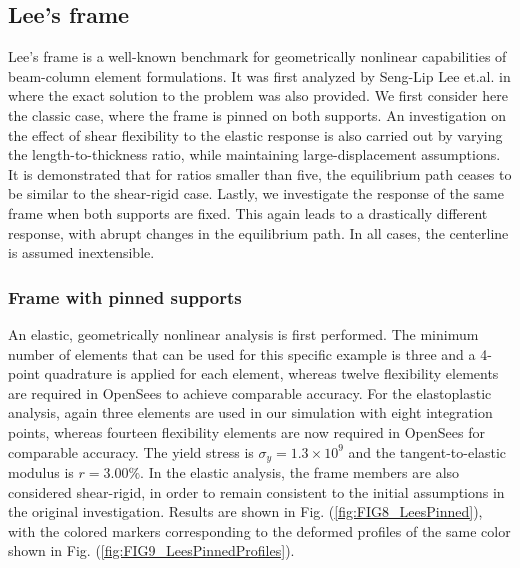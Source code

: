 \subsection{Lee's frame}
Lee's frame is a well-known benchmark for geometrically nonlinear capabilities
of beam-column element formulations.  It was first analyzed by Seng-Lip Lee
et.al. in
\cite{Lee} where the exact solution to the problem was also provided. We
first consider here the classic case, where the frame is pinned on both 
supports.
An investigation on the effect of shear flexibility to the elastic response
is also carried out by varying the length-to-thickness ratio, while maintaining
large-displacement assumptions. It is demonstrated that for ratios smaller than
five, the equilibrium path ceases to be similar to the shear-rigid case. Lastly,
we investigate the response of the same frame when both supports are fixed. This
again leads to a drastically different response, with abrupt changes in the
equilibrium path.  In all cases, the centerline is assumed inextensible.

\subsubsection{Frame with pinned supports}\label{leespinned}

An elastic, geometrically nonlinear analysis is first performed.
The minimum number of elements that can be used for this specific example is 
three
and a 4-point quadrature is applied for each element, whereas twelve flexibility
elements are required in OpenSees to achieve comparable accuracy.
For the elastoplastic analysis, again three elements are used in our
simulation with eight integration points,
whereas fourteen flexibility elements are now required in OpenSees for 
comparable
accuracy. The yield stress is $\sigma_y=1.3\times 10^{9}$ and the
tangent-to-elastic modulus \ratio is $r=3.00\%$. In the elastic
analysis, the
frame members are also considered shear-rigid, in order to remain consistent
to the initial assumptions in the original investigation\cite{Lee}.
Results are shown in Fig. (\ref{fig:FIG8_LeesPinned}), with the colored
markers corresponding to the deformed profiles of the same color shown in
Fig. (\ref{fig:FIG9_LeesPinnedProfiles}).

\begin{figure*}[t]
	\centering
	\qquad
	\caption{Geometrically nonlinear analyses of Lee's frame with pinned
		supports.}%
	\label{fig:FIG8_LeesPinned}%
\end{figure*}

